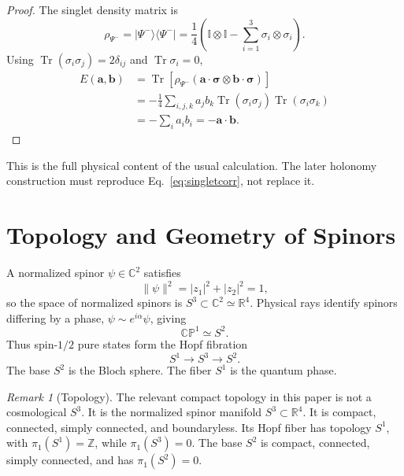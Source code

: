 \documentclass[
  aps,
  pra,
  reprint,
  superscriptaddress,
  nofootinbib,
  longbibliography,
  floatfix,
  amsmath,
  amssymb
]{revtex4-2}
\theoremstyle{plain}
\theoremstyle{definition}
\theoremstyle{remark}
\newtheorem{remark}[theorem]{Remark}
\newcommand{\ket}[1]{\lvert #1\rangle}
\newcommand{\bra}[1]{\langle #1\rvert}
\newcommand{\Tr}{\operatorname{Tr}}
\newcommand{\CP}{\mathbb{CP}}
\newcommand{\RR}{\mathbb{R}}
\newcommand{\CC}{\mathbb{C}}
\newcommand{\Id}{\mathbb{I}}
\newcommand{\Pauli}{\boldsymbol{\sigma}}
\begin{document}
\begin{proof}
The singlet density matrix is
\begin{equation}
\rho_{\Psi^-}=\ket{\Psi^-}\bra{\Psi^-}
=\frac14\left(\Id\otimes\Id-
\sum_{i=1}^{3}\sigma_i\otimes\sigma_i\right).
\label{eq:singletdensity}
\end{equation}
Using \(\Tr(\sigma_i\sigma_j)=2\delta_{ij}\) and \(\Tr\sigma_i=0\),
\begin{align}
E(\bm a,\bm b)
&=\Tr\!\left[\rho_{\Psi^-}(\bm a\cdot\Pauli\otimes\bm b\cdot\Pauli)\right] \\
&=-\frac14\sum_{i,j,k} a_j b_k
\Tr(\sigma_i\sigma_j)\Tr(\sigma_i\sigma_k) \\
&=-\sum_i a_i b_i=-\bm a\cdot\bm b .
\end{align}
\end{proof}

This is the full physical content of the usual calculation.  The later holonomy construction must reproduce Eq.~\eqref{eq:singletcorr}, not replace it.

\section{Topology and Geometry of Spinors}
\label{sec:hopf}

A normalized spinor \(\psi\in\CC^2\) satisfies
\begin{equation}
\lVert\psi\rVert^2=|z_1|^2+|z_2|^2=1,
\end{equation}
so the space of normalized spinors is \(S^3\subset\CC^2\simeq\RR^4\).  Physical rays identify spinors differing by a phase, \(\psi\sim e^{i\alpha}\psi\), giving
\begin{equation}
\CP^1\simeq S^2.
\end{equation}
Thus spin-\(1/2\) pure states form the Hopf fibration
\begin{equation}
S^1\longrightarrow S^3\longrightarrow S^2.
\label{eq:hopf}
\end{equation}
The base \(S^2\) is the Bloch sphere.  The fiber \(S^1\) is the quantum phase.

\begin{remark}[Topology]
The relevant compact topology in this paper is not a cosmological \(S^3\).  It is the normalized spinor manifold \(S^3\subset\RR^4\).  It is compact, connected, simply connected, and boundaryless.  Its Hopf fiber has topology \(S^1\), with \(\pi_1(S^1)=\mathbb Z\), while \(\pi_1(S^3)=0\).  The base \(S^2\) is compact, connected, simply connected, and has \(\pi_1(S^2)=0\).
\end{remark}
\end{document}
